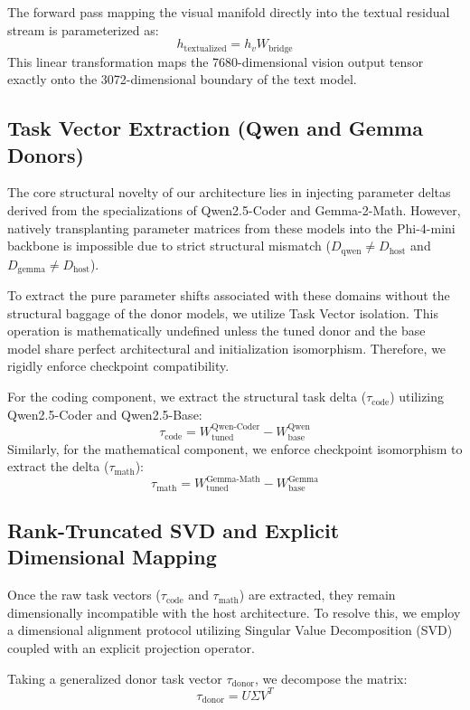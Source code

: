 \documentclass[11pt]{article}
\begin{document}
The forward pass mapping the visual manifold directly into the textual residual stream is parameterized as:
$$ h_{\text{textualized}} = h_{v} W_{\text{bridge}} $$
This linear transformation maps the 7680-dimensional vision output tensor exactly onto the 3072-dimensional boundary of the text model. 

\subsection{Task Vector Extraction (Qwen and Gemma Donors)}
The core structural novelty of our architecture lies in injecting parameter deltas derived from the specializations of Qwen2.5-Coder and Gemma-2-Math. However, natively transplanting parameter matrices from these models into the Phi-4-mini backbone is impossible due to strict structural mismatch ($D_{\text{qwen}} \neq D_{\text{host}}$ and $D_{\text{gemma}} \neq D_{\text{host}}$).

To extract the pure parameter shifts associated with these domains without the structural baggage of the donor models, we utilize Task Vector isolation. This operation is mathematically undefined unless the tuned donor and the base model share perfect architectural and initialization isomorphism. Therefore, we rigidly enforce checkpoint compatibility. 

For the coding component, we extract the structural task delta ($\tau_{\text{code}}$) utilizing Qwen2.5-Coder and Qwen2.5-Base:
$$ \tau_{\text{code}} = W_{\text{tuned}}^{\text{Qwen-Coder}} - W_{\text{base}}^{\text{Qwen}} $$
Similarly, for the mathematical component, we enforce checkpoint isomorphism to extract the delta ($\tau_{\text{math}}$):
$$ \tau_{\text{math}} = W_{\text{tuned}}^{\text{Gemma-Math}} - W_{\text{base}}^{\text{Gemma}} $$

\subsection{Rank-Truncated SVD and Explicit Dimensional Mapping}
Once the raw task vectors ($\tau_{\text{code}}$ and $\tau_{\text{math}}$) are extracted, they remain dimensionally incompatible with the host architecture. To resolve this, we employ a dimensional alignment protocol utilizing Singular Value Decomposition (SVD) coupled with an explicit projection operator.

Taking a generalized donor task vector $\tau_{\text{donor}}$, we decompose the matrix:
$$ \tau_{\text{donor}} = U \Sigma V^T $$
\end{document}
